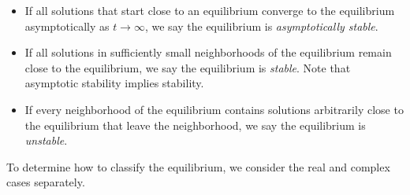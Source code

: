 \documentclass[reqno]{immbook}
\numberwithin{equation}{chapter}
\numberwithin{question}{section}
\numberwithin{theorem}{chapter}
\numberwithin{figure}{chapter}
\theoremstyle{definition}
\begin{document}
\begin{itemize}
\item If all solutions that start close to an equilibrium converge
to the equilibrium asymptotically as $t\rightarrow\infty$, we
say the equilibrium is
\emph{asymptotically stable}.
\item If all solutions in sufficiently small neighborhoods
of the equilibrium remain close to the equilibrium, we say
the equilibrium is \emph{stable}.
Note that asymptotic stability implies stability.
\item If every neighborhood of the equilibrium contains solutions
arbitrarily close to the equilibrium that leave the neighborhood, we say the equilibrium is \emph{unstable}. 
\end{itemize}
To determine how to classify the equilibrium, we consider
the real and complex cases separately.
\end{document}
